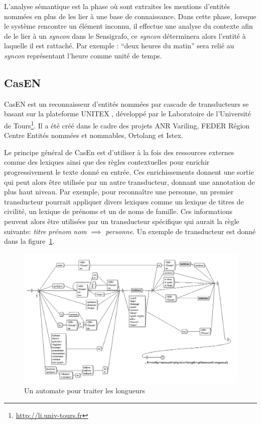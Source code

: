 \documentclass[12pt,a4paper,times,twoside,openright]{report}
\begin{document}
L'analyse sémantique est la phase où sont extraites les mentions d'entités nommées en plus de les lier à une base de connaissance. Dans cette phase, lorsque le système rencontre un élément inconnu, il effectue une analyse du contexte afin de le lier à un \emph{syncon} dans le Sensigrafo, ce \emph{syncon} déterminera alors l'entité à laquelle il est rattaché. Par exemple : ``deux heures du matin'' sera relié au \emph{syncon} représentant l'heure comme unité de temps.


        
        \subsection{CasEN}
CasEN \citep{maurel2011cascades} est un reconnaisseur d'entités nommées par cascade de transducteurs se basant sur la plateforme UNITEX \citep{paumier2011unitex}, développé par le Laboratoire de l'Université de Tours\footnote{\url{http://li.univ-tours.fr}}. Il a été créé dans le cadre des projets ANR Variling, FEDER Région Centre Entités nommées et nommables, Ortolang et Istex.

Le principe général de CasEn est d'utiliser à la fois des ressources externes comme des lexiques ainsi que des règles contextuelles pour enrichir progressivement le texte donné en entrée. Ces enrichissements donnent une sortie qui peut alors être utilisée par un autre transducteur, donnant une annotation de plus haut niveau. Par exemple, pour reconnaître une personne, un premier transducteur pourrait appliquer divers lexiques comme un lexique de titres de civilité, un lexique de prénoms et un de noms de famille. Ces informations peuvent alors être utilisées par un transducteur spécifique qui aurait la règle suivante: \emph{titre} \emph{prénom} \emph{nom} $\implies$ \emph{personne}. Un exemple de transducteur est donné dans la figure\ \ref{fig:casen-longueur}.

\begin{figure}[ht!]
    \centering
    \includegraphics[scale=0.5]{images/CasEN/longueurs}
    \caption{Un automate pour traiter les longueurs}
    \label{fig:casen-longueur}
\end{figure}
\end{document}
